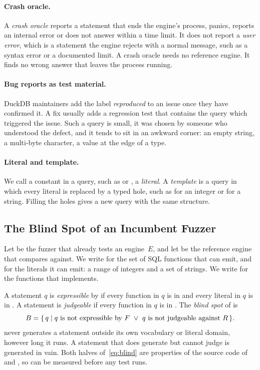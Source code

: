 \paragraph{Crash oracle.} A \emph{crash oracle} reports a statement that ends the
engine's process, panics, reports an internal error or does not answer within a
time limit. It does not report a \emph{user error}, which is a statement the
engine rejects with a normal message, such as a syntax error or a documented
limit. A crash oracle needs no reference engine. It finds no wrong answer that
leaves the process running.

\paragraph{Bug reports as test material.} DuckDB maintainers add the label
\emph{reproduced} to an issue once they have confirmed it. A fix usually adds a
regression test that contains the query which triggered the issue. Such a query
is small, it was chosen by someone who understood the defect, and it tends to sit
in an awkward corner: an empty string, a multi-byte character, a value at the
edge of a type.

\paragraph{Literal and template.} We call a constant in a query, such as
 or , a \emph{literal}. A \emph{template} is a query in which
every literal is replaced by a typed hole, such as  for an integer or
 for a string. Filling the holes gives a new query with the same
structure.

\subsection{The Blind Spot of an Incumbent Fuzzer}
\label{sec:problem}

Let \Fz be the fuzzer that already tests an engine~$E$, and let \Rengine be the
reference engine that \Fz compares against. We write \Voc for the set of SQL
functions that \Fz can emit, and \Lit for the literals it can emit: a range of
integers and a set of strings. We write \VocR for the functions that \Rengine
implements.

A statement $q$ is \emph{expressible} by \Fz if every function in $q$ is in \Voc
and every literal in $q$ is in \Lit. A statement is \emph{judgeable} if every
function in $q$ is in \VocR. The \emph{blind spot} of \Fz is
\begin{equation}
  \label{eq:blind}
  B = \{\, q \mid q \text{ is not expressible by } F
           \ \lor\ q \text{ is not judgeable against } R \,\}.
\end{equation}
\Fz never generates a statement outside its own vocabulary or literal domain,
however long it runs. A statement that \Fz does generate but cannot judge is
generated in vain. Both halves of~\eqref{eq:blind} are properties of the source
code of \Fz and \Rengine, so \Blind can be measured before any test runs.

